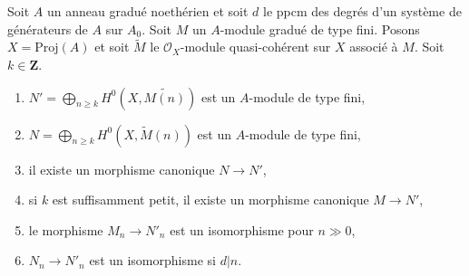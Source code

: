 \begin{lemma}
\label{lemma-recover-tail-graded-module-general}
Soit $A$ un anneau gradué noethérien et soit $d$ le ppcm des degrés d'un
système de générateurs de $A$ sur $A_0$. Soit $M$ un $A$-module gradué de type fini.
Posons $X = \text{Proj}(A)$ et soit $\widetilde{M}$ le
$\mathcal{O}_X$-module quasi-cohérent sur $X$ associé à $M$. Soit
$k \in \mathbf{Z}$.
\begin{enumerate}
\item $N' = \bigoplus_{n \geq k} H^0(X, \widetilde{M(n)})$
est un $A$-module de type fini,
\item $N = \bigoplus_{n \geq k} H^0(X, \widetilde{M}(n))$
est un $A$-module de type fini,
\item il existe un morphisme canonique $N \to N'$,
\item si $k$ est suffisamment petit, il existe un morphisme canonique
$M \to N'$,
\item le morphisme $M_n \to N'_n$ est un isomorphisme pour $n \gg 0$,
\item $N_n \to N'_n$ est un isomorphisme si $d | n$.
\end{enumerate}
\end{lemma}


